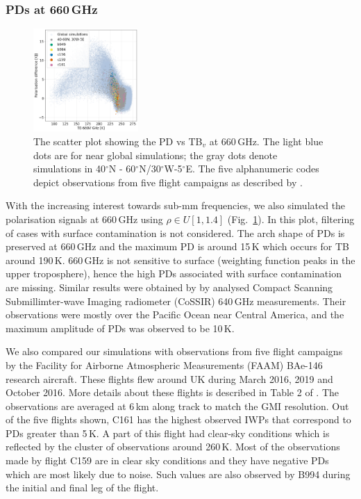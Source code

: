 \documentclass[amt, manuscript]{copernicus}
\begin{document}
\subsubsection{PDs at 660\,GHz}
%
\label{sec:submm_pd}
\begin{figure}[t]
	\includegraphics[width=4cm]{Figures/PD_660.png}
	\caption{The scatter plot showing the PD vs TB$_v$ at 660\,GHz. The light blue dots are for near global simulations; the gray dots denote simulations in 40$^{\circ}$N - 60$^{\circ}$N/30$^{\circ}$W-5$^{\circ}$E. The five alphanumeric codes depict observations from five flight campaigns as described by \citet{fox2020evaluation}. }
	\label{fig:PD_660}
\end{figure}

With the increasing interest towards sub-mm frequencies, we also simulated the polarisation signals at 660\,GHz using $\rho\in U[1, 1.4]$ (Fig.~\ref{fig:PD_660}). In this plot, filtering of cases with surface contamination is not considered. The arch shape of PDs is preserved at 660\,GHz and the maximum PD is around 15\,K which occurs for TB around 190\,K. 660\,GHz is not sensitive to surface (weighting function peaks in the upper troposphere), hence the high PDs associated with surface contamination are missing. Similar results were obtained by \citet{gong:micro:17} by analysed Compact Scanning Submillimter-wave Imaging radiometer (CoSSIR) 640\,GHz measurements. Their observations were mostly over the Pacific Ocean near Central America, and the maximum amplitude of PDs was observed to be 10\,K.

We also compared our simulations with observations from five flight campaigns by the Facility for Airborne Atmospheric Measurements (FAAM) BAe-146 research aircraft. These flights flew around UK during March 2016, 2019 and October 2016. More details about these flights is described in Table 2 of \citet{fox2020evaluation}. The observations are averaged at 6\,km along track to match the GMI resolution. Out of the five flights shown, C161 has the highest observed IWPs that correspond to PDs greater than 5\,K. A part of this flight had clear-sky conditions which is reflected by the cluster of observations around 260\,K. Most of the observations made by flight C159 are in clear sky conditions \citep{fox2020evaluation} and they have negative PDs which are most likely due to noise. Such values are also observed by B994 during the initial and final leg of the flight. 
\end{document}

